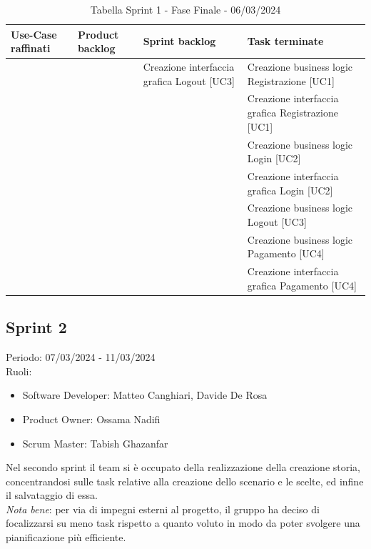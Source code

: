 \documentclass{article}
\begin{document}
\begin{table}[h]
    \centering
    \begin{tabularx}{\textwidth}{|X|X|X|X|}
        \hline
        \bf Use-Case raffinati & \bf Product backlog & \bf Sprint backlog & \bf Task terminate \\
        \hline
        & & Creazione interfaccia grafica Logout [UC3] & Creazione business logic Registrazione [UC1] \\
        \hline
        & & & Creazione interfaccia grafica  Registrazione [UC1] \\
        \hline
        & & & Creazione business logic Login [UC2] \\
        \hline
        & & & Creazione interfaccia grafica Login [UC2] \\
        \hline
        & & & Creazione business logic Logout [UC3] \\
        \hline
        & & & Creazione business logic Pagamento [UC4] \\
        \hline
        & & & Creazione interfaccia grafica Pagamento [UC4] \\
        \hline
    \end{tabularx}
    \caption*{Tabella Sprint 1 - Fase Finale - 06/03/2024}
\end{table}

\newpage
\subsection{Sprint 2}
Periodo: 07/03/2024 - 11/03/2024\vspace*{7pt}\\
Ruoli:
\begin{itemize}[label = { }]
    \itemsep0em
    \item Software Developer: Matteo Canghiari, Davide De Rosa
    \item Product Owner: Ossama Nadifi 
    \item Scrum Master: Tabish Ghazanfar
\end{itemize}
Nel secondo sprint il team si è occupato della realizzazione della creazione storia, concentrandosi sulle task relative alla creazione dello scenario e le scelte, ed infine il salvataggio di essa.\vspace*{7pt}\\
\textit{Nota bene}: per via di impegni esterni al progetto, il gruppo ha deciso di focalizzarsi su meno task rispetto a quanto voluto in modo da poter svolgere una pianificazione più efficiente.
\end{document}
